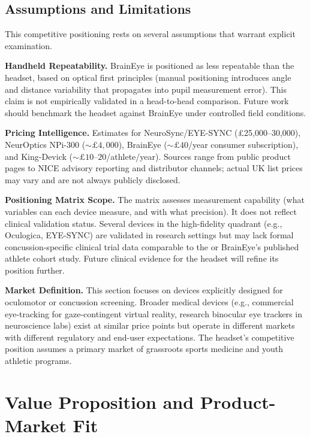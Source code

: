 \subsection{Assumptions and Limitations}
\label{sec:ent-competitive-assumptions}

This competitive positioning rests on several assumptions that warrant explicit examination.

\textbf{Handheld Repeatability.} BrainEye is positioned as less repeatable than the headset, based on optical first principles (manual positioning introduces angle and distance variability that propagates into pupil measurement error). This claim is not empirically validated in a head-to-head comparison. Future work should benchmark the headset against BrainEye under controlled field conditions.

\textbf{Pricing Intelligence.} Estimates for NeuroSync/EYE-SYNC (\pounds 25{,}000--30{,}000), NeurOptics NPi-300 (${\sim}\pounds 4{,}000$), BrainEye (${\sim}\pounds 40$/year consumer subscription), and King-Devick (${\sim}\pounds 10$--$20$/athlete/year). Sources range from public product pages to NICE advisory reporting and distributor channels; actual UK list prices may vary and are not always publicly disclosed.

\textbf{Positioning Matrix Scope.} The matrix assesses measurement capability (what variables can each device measure, and with what precision). It does not reflect clinical validation status. Several devices in the high-fidelity quadrant (e.g., Oculogica, EYE-SYNC) are validated in research settings but may lack formal concussion-specific clinical trial data comparable to the  or BrainEye's published athlete cohort study. Future clinical evidence for the headset will refine its position further.

\textbf{Market Definition.} This section focuses on devices explicitly designed for oculomotor or concussion screening. Broader medical devices (e.g., commercial eye-tracking for gaze-contingent virtual reality, research binocular eye trackers in neuroscience labs) exist at similar price points but operate in different markets with different regulatory and end-user expectations. The headset's competitive position assumes a primary market of grassroots sports medicine and youth athletic programs.


\section{Value Proposition and Product-Market Fit}
\label{sec:ent-value-prop}


